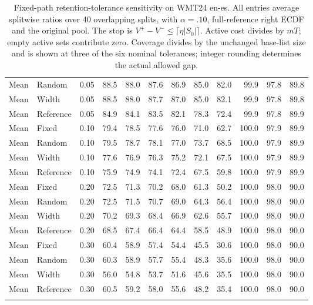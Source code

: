 \begin{table}[t]
\begin{tabular}{llrrrrrrrrrr}
Mean & Random & 0.05 & 88.5 & 88.0 & 87.6 & 86.9 & 85.0 & 82.0 & 99.9 & 97.8 & 89.8 \\
Mean & Width & 0.05 & 88.5 & 88.0 & 87.7 & 87.0 & 85.0 & 82.1 & 99.9 & 97.8 & 89.8 \\
Mean & Reference & 0.05 & 84.9 & 84.1 & 83.5 & 82.1 & 78.3 & 72.4 & 99.9 & 97.8 & 89.9 \\
\addlinespace
Mean & Fixed & 0.10 & 79.4 & 78.5 & 77.6 & 76.0 & 71.0 & 62.7 & 100.0 & 97.9 & 89.9 \\
Mean & Random & 0.10 & 79.5 & 78.7 & 78.1 & 77.0 & 73.7 & 68.5 & 100.0 & 97.9 & 89.9 \\
Mean & Width & 0.10 & 77.6 & 76.9 & 76.3 & 75.2 & 72.1 & 67.5 & 100.0 & 97.9 & 89.9 \\
Mean & Reference & 0.10 & 75.9 & 74.9 & 74.1 & 72.4 & 67.5 & 59.8 & 100.0 & 97.9 & 89.9 \\
\addlinespace
Mean & Fixed & 0.20 & 72.5 & 71.3 & 70.2 & 68.0 & 61.3 & 50.2 & 100.0 & 98.0 & 90.0 \\
Mean & Random & 0.20 & 72.5 & 71.5 & 70.7 & 69.0 & 64.3 & 56.4 & 100.0 & 98.0 & 90.0 \\
Mean & Width & 0.20 & 70.2 & 69.3 & 68.4 & 66.9 & 62.6 & 55.7 & 100.0 & 98.0 & 90.0 \\
Mean & Reference & 0.20 & 68.5 & 67.4 & 66.4 & 64.4 & 58.5 & 48.9 & 100.0 & 98.0 & 90.0 \\
\addlinespace
Mean & Fixed & 0.30 & 60.4 & 58.9 & 57.4 & 54.4 & 45.5 & 30.6 & 100.0 & 98.0 & 90.0 \\
Mean & Random & 0.30 & 60.3 & 58.9 & 57.7 & 55.4 & 48.3 & 35.6 & 100.0 & 98.0 & 90.0 \\
Mean & Width & 0.30 & 56.0 & 54.8 & 53.7 & 51.6 & 45.6 & 35.5 & 100.0 & 98.0 & 90.0 \\
Mean & Reference & 0.30 & 60.5 & 59.2 & 58.0 & 55.6 & 48.2 & 35.4 & 100.0 & 98.0 & 90.0 \\
\addlinespace
\bottomrule
\end{tabular}
\caption{Fixed-path retention-tolerance sensitivity on WMT24 en-es. All entries average splitwise ratios over 40 overlapping splits, with $\alpha=.10$, full-reference right ECDF and the original pool. The stop is $V^+-V^-\le\lceil\eta|S_0|\rceil$. Active cost divides by $mT$; empty active sets contribute zero. Coverage divides by the unchanged base-list size and is shown at three of the six nominal tolerances; integer rounding determines the actual allowed gap.}
\label{tab:tolerance-all-4}
\end{table}

